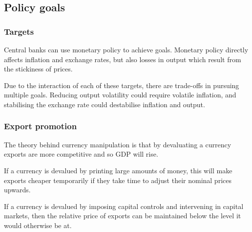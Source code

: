 
\subsection{Policy goals}

\subsubsection{Targets}

Central banks can use monetary policy to achieve goals. Monetary policy directly affects inflation and exchange rates, but also losses in output which result from the stickiness of prices.

Due to the interaction of each of these targets, there are trade-offs in pursuing multiple goals. Reducing output volatility could require volatile inflation, and stabilising the exchange rate could destabilise inflation and output.

\subsubsection{Export promotion}

The theory behind currency manipulation is that by devaluating a currency exports are more competitive and so GDP will rise.

If a currency is devalued by printing large amounts of money, this will make exports cheaper temporarily if they take time to adjust their nominal prices upwards.

If a currency is devalued by imposing capital controls and intervening in capital markets, then the relative price of exports can be maintained below the level it would otherwise be at.

